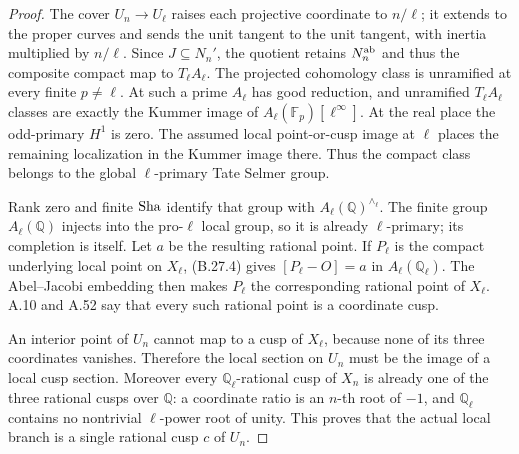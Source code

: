 \begin{proof}
The cover $U_n\to U_\ell$ raises each projective
coordinate to $n/\ell$; it extends to the proper
curves and sends the unit tangent to the unit
tangent, with inertia multiplied by $n/\ell$.
Since $J\subseteq N_n'$, the quotient retains
$N_n^{\rm ab}$ and thus the composite compact
map to $T_\ell A_\ell$.
The projected cohomology class is unramified at
every finite $p\ne\ell$.
At such a prime $A_\ell$ has good reduction,
and unramified $T_\ell A_\ell$ classes are
exactly the Kummer image of
$A_\ell(\mathbb F_p)[\ell^\infty]$.
At the real place the odd-primary $H^1$ is zero.
The assumed local point-or-cusp image at $\ell$
places the remaining localization in the Kummer
image there. Thus the compact class belongs
to the global $\ell$-primary Tate Selmer group.

Rank zero and finite $\mathop{\mathrm{Sha}}$ identify that group
with $A_\ell(\mathbb Q)^{\wedge_\ell}$.
The finite group $A_\ell(\mathbb Q)$ injects
into the pro-$\ell$ local group, so it is
already $\ell$-primary; its completion is itself.
Let $a$ be the resulting rational point.
If $P_\ell$ is the compact underlying local
point on $X_\ell$, (B.27.4) gives
$[P_\ell-O]=a$ in $A_\ell(\mathbb Q_\ell)$.
The Abel--Jacobi embedding then makes
$P_\ell$ the corresponding rational point
of $X_\ell$. A.10 and A.52 say that every
such rational point is a coordinate cusp.

An interior point of $U_n$ cannot map to a cusp
of $X_\ell$, because none of its three coordinates
vanishes. Therefore the local section on $U_n$
must be the image of a local cusp section.
Moreover every $\mathbb Q_\ell$-rational cusp
of $X_n$ is already one of the three rational
cusps over $\mathbb Q$: a coordinate ratio is
an $n$-th root of $-1$, and
$\mathbb Q_\ell$ contains no nontrivial
$\ell$-power root of unity.
This proves that the actual local branch is
a single rational cusp $c$ of $U_n$.


\end{proof}
